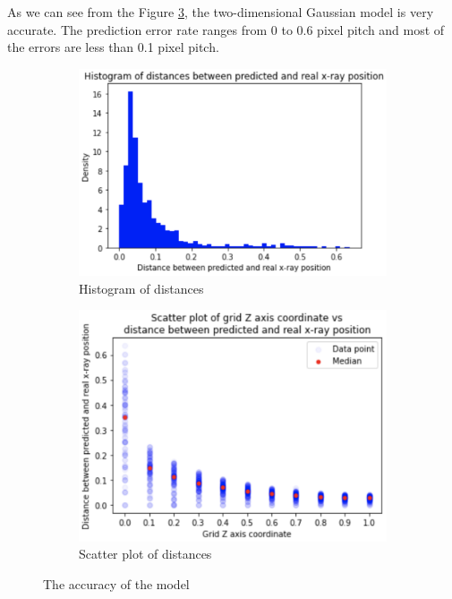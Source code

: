 \documentclass[final]{beamer}
\newlength{\colwidth}
\begin{document}
\begin{frame}[t]
\begin{columns}[t]
\begin{column}{\colwidth}
    \vspace{0.5cm}

    As we can see from the Figure \ref{fig:model}, the two-dimensional Gaussian model is very accurate. The prediction error rate ranges from 0 to 0.6 pixel pitch and most of the errors are less than 0.1 pixel pitch. 
    \vspace{0.8cm}

    \begin{figure}[H]
    \centering
    \begin{subfigure}{.5\textwidth}
      \centering
      \includegraphics[width=1\linewidth]{images/histogram.png}
      \caption{Histogram of distances}
      \label{fig:sub1}
    \end{subfigure}%
    \begin{subfigure}{.5\textwidth}
      \centering
      \includegraphics[width=0.9\linewidth]{images/scatter_plot.png}
      \caption{Scatter plot of distances}
      \label{fig:sub2}
    \end{subfigure}
    \caption{The accuracy of the model}
    \label{fig:model}
    \end{figure}



\end{column}
\end{columns}
\end{frame}
\end{document}
